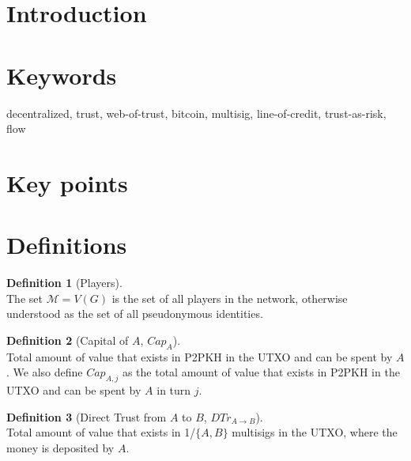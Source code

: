 \documentclass[11pt]{article}
\theoremstyle{definition}
\newtheorem{definition}{Definition}[section]
\theoremstyle{corollary}
\theoremstyle{lemma}
\begin{document}
  \section{Introduction}

  \section{Keywords}
      decentralized, trust, web-of-trust, bitcoin, multisig, line-of-credit, trust-as-risk, flow  

  \section{Key points}

  \section{Definitions}
      \begin{definition}[Players] \ \\
         The set $\mathcal{M} = V(G)$ is the set of all players in the network, otherwise understood as the set of all
         pseudonymous identities.
      \end{definition}
      \begin{definition}[Capital of $A$, $Cap_A$] \ \\
        Total amount of value that exists in P2PKH in the UTXO and can be spent by $A$. We also define $Cap_{A,j}$ as
        the total amount of value that exists in P2PKH in the UTXO and can be spent by $A$ in turn $j$.
      \end{definition}
      \begin{definition}[Direct Trust from $A$ to $B$, $DTr_{A \rightarrow B}$] \ \\
         Total amount of value that exists in 1/$\{A,B\}$ multisigs in the UTXO, where the money is deposited by $A$.
      \end{definition}
\end{document}
